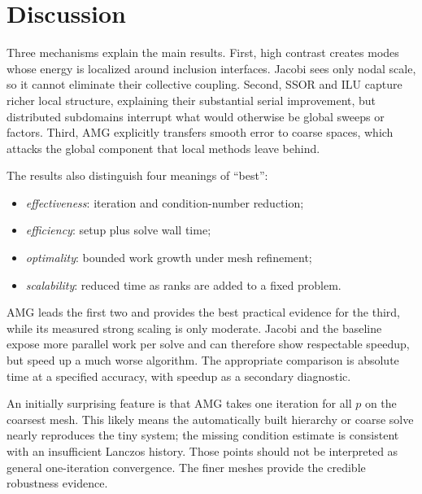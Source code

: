 \documentclass[10pt,a4paper]{article}
\begin{document}
\newpage
\section{Discussion}
Three mechanisms explain the main results. First, high contrast creates modes whose energy is
localized around inclusion interfaces. Jacobi sees only nodal scale, so it cannot eliminate their
collective coupling. Second, SSOR and ILU capture richer local structure, explaining their substantial
serial improvement, but distributed subdomains interrupt what would otherwise be global sweeps or
factors. Third, AMG explicitly transfers smooth error to coarse spaces, which attacks the global
component that local methods leave behind.

The results also distinguish four meanings of ``best'':
\begin{itemize}
 \item \emph{effectiveness}: iteration and condition-number reduction;
 \item \emph{efficiency}: setup plus solve wall time;
 \item \emph{optimality}: bounded work growth under mesh refinement;
 \item \emph{scalability}: reduced time as ranks are added to a fixed problem.
\end{itemize}
AMG leads the first two and provides the best practical evidence for the third, while its measured
strong scaling is only moderate. Jacobi and the baseline expose more parallel work per solve and can
therefore show respectable speedup, but speed up a much worse algorithm. The appropriate comparison
is absolute time at a specified accuracy, with speedup as a secondary diagnostic.

An initially surprising feature is that AMG takes one iteration for all $p$ on the coarsest mesh.
This likely means the automatically built hierarchy or coarse solve nearly reproduces the tiny
system; the missing condition estimate is consistent with an insufficient Lanczos history. Those
points should not be interpreted as general one-iteration convergence. The finer meshes provide the
credible robustness evidence.

\newpage
\end{document}
